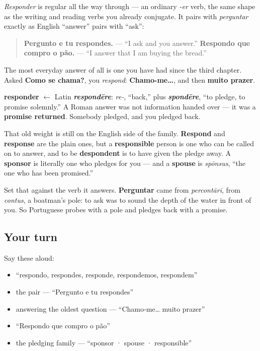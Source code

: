 \emph{Responder} is regular all the way through — an ordinary \emph{-er} verb, the same shape as the writing and reading verbs you already conjugate. It pairs with \emph{perguntar} exactly as English \textquotedblleft{}answer\textquotedblright{} pairs with \textquotedblleft{}ask\textquotedblright{}:

\begin{quote}
\textbf{Pergunto e tu respondes.} — \textquotedblleft{}I ask and you answer.\textquotedblright{} \textbf{Respondo que compro o pão.} — \textquotedblleft{}I answer that I am buying the bread.\textquotedblright{}
\end{quote}

The most everyday answer of all is one you have had since the third chapter. Asked \textbf{Como se chama?}, you \emph{respond}: \textbf{Chamo-me…}, and then \textbf{muito prazer}.

\begin{cousinweb}
\textbf{responder} $\leftarrow$ Latin \emph{\textbf{respondēre}}: \emph{re-}, \textquotedblleft{}back,\textquotedblright{} plus \emph{\textbf{spondēre}}, \textquotedblleft{}to pledge, to promise solemnly.\textquotedblright{} A Roman answer was not information handed over — it was a \textbf{promise returned}. Somebody pledged, and you pledged back.

That old weight is still on the English side of the family. \textbf{Respond} and \textbf{response} are the plain ones, but a \textbf{responsible} person is one who can be called on to answer, and to be \textbf{despondent} is to have given the pledge away. A \textbf{sponsor} is literally one who pledges for you — and a \textbf{spouse} is \emph{spōnsus}, \textquotedblleft{}the one who has been promised.\textquotedblright{}

Set that against the verb it answers. \textbf{Perguntar} came from \emph{percontārī}, from \emph{contus}, a boatman's pole: to ask was to sound the depth of the water in front of you. So Portuguese probes with a pole and pledges back with a promise.
\end{cousinweb}

\subsection*{Your turn}
Say these aloud:

\begin{itemize}
\raggedright
  \item \textquotedblleft{}respondo, respondes, responde, respondemos, respondem\textquotedblright{}
  \item the pair — \textquotedblleft{}Pergunto e tu respondes\textquotedblright{}
  \item answering the oldest question — \textquotedblleft{}Chamo-me… muito prazer\textquotedblright{}
  \item \textquotedblleft{}Respondo que compro o pão\textquotedblright{}
  \item the pledging family — \textquotedblleft{}sponsor · spouse · responsible\textquotedblright{}
\end{itemize}

